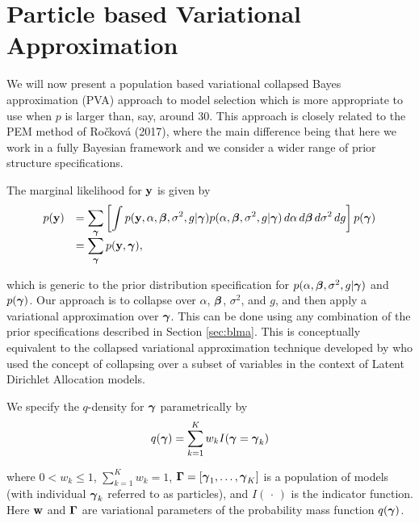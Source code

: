 \section{Particle based Variational Approximation}
\label{sec:pb-pva}

We will now present a population based variational collapsed Bayes approximation (PVA) approach to model 
selection which is more appropriate to use when $p$ is larger than, say, around $30$. This approach is closely related to the PEM  method of Ro\v{c}kov\'{a} (2017), 
where the main difference being that here we work in a fully Bayesian framework
and we consider a wider range of prior structure specifications.

The marginal likelihood for ${\bf y}$ is given by
$$
\begin{array}{rl}
\displaystyle p({\bf y}) 
& \displaystyle = \sum_{{\boldsymbol \gamma}} \left[ \int p({\bf y},\alpha,{\boldsymbol \beta},\sigma^2,g|{\boldsymbol \gamma}) p(\alpha,{\boldsymbol \beta},\sigma^2,g|{\boldsymbol \gamma}) \, d\alpha \, d{\boldsymbol \beta} \, d\sigma^2 \, dg\right] p({\boldsymbol \gamma}) 
\\
& \displaystyle = \sum_{{\boldsymbol \gamma}} p({\bf y},{\boldsymbol \gamma}),
\end{array} 
$$

\noindent which is generic to the  prior distribution specification for 
$p(\alpha,{\boldsymbol \beta},\sigma^2,g|{\boldsymbol \gamma})$ and $p({\boldsymbol \gamma})$. 
Our approach is to collapse over $\alpha$, ${\boldsymbol \beta}$, $\sigma^2$, and $g$,
and then apply a variational approximation over ${\boldsymbol \gamma}$.
This can be done using any combination of the prior specifications
described in Section \ref{sec:blma}.
This is conceptually equivalent to the collapsed
variational approximation technique developed by \cite{Teh2006}  
who used the concept of collapsing over a subset of variables in the
context of  Latent Dirichlet Allocation models.

We specify the $q$-density for ${\boldsymbol \gamma}$ parametrically by
\begin{equation}\label{eq:qgamma} 
q({\boldsymbol \gamma}) = \sum_{k=1}^K w_k I({\boldsymbol \gamma} = {\boldsymbol \gamma}_k)
\end{equation} 

\noindent 
where $0 < w_k \le 1$, $\sum_{k=1}^K w_k = 1$, ${\boldsymbol \Gamma} = [{\boldsymbol \gamma}_1,\ldots,{\boldsymbol \gamma}_K]$ is a population of models 
(with
individual ${\boldsymbol \gamma}_k$ referred to as particles), and $I(\,\cdot\,)$
is the indicator function. Here
${\bf w}$ and ${\boldsymbol \Gamma}$ are variational parameters of the probability mass function 
$q({\boldsymbol \gamma})$.

